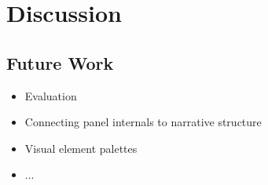 \section{Discussion}

\subsection{Future Work}

\begin{itemize}
\item Evaluation
\item Connecting panel internals to narrative structure
\item Visual element palettes
\item ...
\end{itemize}
